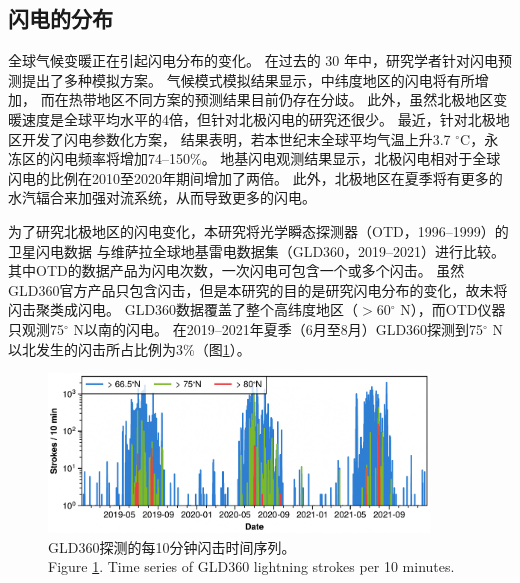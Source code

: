 \subsection{闪电的分布} \label{subsect:lightning_distribution}

全球气候变暖正在引起闪电分布的变化\citep{Reeve.1999,Williams.2005a,Price.2009a}。
在过去的 30 年中，研究学者针对闪电预测提出了多种模拟方案\citep{Price.1992,Price.1997b,Allen.2002,Futyan.2007,Finney.2014,Romps.2014}。
气候模式模拟结果显示，中纬度地区的闪电将有所增加\citep{Michalon.1999,Romps.2014,Luhar.2021}，
而在热带地区不同方案的预测结果目前仍存在分歧\citep{Finney.2018,Romps.2019}。
此外，虽然北极地区变暖速度是全球平均水平的4倍\citep{Rantanen.2022}，但针对北极闪电的研究还很少。
最近，\citet{Chen.2021a}针对北极地区开发了闪电参数化方案，
结果表明，若本世纪末全球平均气温上升3.7 $^{\circ}$C，永冻区的闪电频率将增加74--150\%。
地基闪电观测结果显示，北极闪电相对于全球闪电的比例在2010至2020年期间增加了两倍\citep{Holzworth.2021}。
此外，北极地区在夏季将有更多的水汽辐合来加强对流系统，从而导致更多的闪电\citep{Bintanja.2020}。

为了研究北极地区的闪电变化，本研究将光学瞬态探测器（OTD，1996--1999）的卫星闪电数据
与维萨拉全球地基雷电数据集（GLD360，2019--2021）进行比较。
其中OTD的数据产品为闪电次数，一次闪电可包含一个或多个闪击。
虽然GLD360官方产品只包含闪击，但是本研究的目的是研究闪电分布的变化，故未将闪击聚类成闪电。
GLD360数据覆盖了整个高纬度地区（$>$60$^{\circ}$ N），而OTD仪器只观测75$^{\circ}$ N以南的闪电。
在2019--2021年夏季（6月至8月）GLD360探测到75$^{\circ}$ N 以北发生的闪击所占比例为3\%（图\ref{fig:gld360_tseries}）。

\begin{figure}[H]
\centering
\includegraphics[width=0.9\textwidth]{./figures/arctic_gld360_tseries.png}
\caption{
GLD360探测的每10分钟闪击时间序列。\\
Figure \ref{fig:gld360_tseries}. Time series of GLD360 lightning strokes per 10 minutes.
}
\label{fig:gld360_tseries}
\end{figure}


